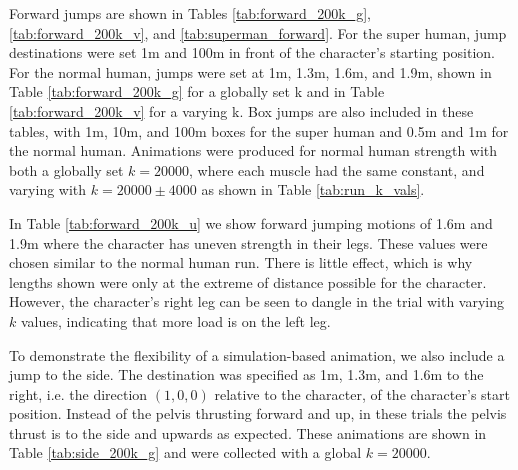 Forward jumps are shown in Tables \ref{tab:forward_200k_g}, \ref{tab:forward_200k_v}, and \ref{tab:superman_forward}. For the super human, jump destinations were set 1m and 100m in front of the character's starting position.  For the normal human, jumps were set at 1m, 1.3m, 1.6m, and 1.9m, shown in Table \ref{tab:forward_200k_g} for a globally set k and in Table \ref{tab:forward_200k_v} for a varying k.  Box jumps are also included in these tables, with 1m, 10m, and 100m boxes for the super human and 0.5m and 1m for the normal human.  Animations were produced for normal human strength with both a globally set $k=20000$, where each muscle had the same constant, and varying with $k=20000\pm 4000$ as shown in Table \ref{tab:run_k_vals}.

In Table \ref{tab:forward_200k_u} we show forward jumping motions of 1.6m and 1.9m where the character has uneven strength in their legs.  These values were chosen similar to the normal human run.  There is little effect, which is why lengths shown were only at the extreme of distance possible for the character.  However, the character's right leg can be seen to dangle in the trial with varying $k$ values, indicating that more load is on the left leg.

To demonstrate the flexibility of a simulation-based animation, we also include a jump to the side.  The destination was specified as 1m, 1.3m, and 1.6m to the right, i.e. the direction $(1, 0, 0)$ relative to the character, of the character's start position.  Instead of the pelvis thrusting forward and up, in these trials the pelvis thrust is to the side and upwards as expected.  These animations are shown in Table \ref{tab:side_200k_g} and were collected with a global $k=20000$.

\newcommand{\floatedfig}[1]{\begin{subfigure}[h]{0.2\textwidth}\vspace{1mm}\texttt{[image: \#1]}\vspace{1mm}\end{subfigure}\hspace{0.025\textwidth}}
\newcommand{\framesubfig}[1]{\begin{subfigure}[h]{0.24\textwidth}\texttt{[image: \#1]}\end{subfigure}}

